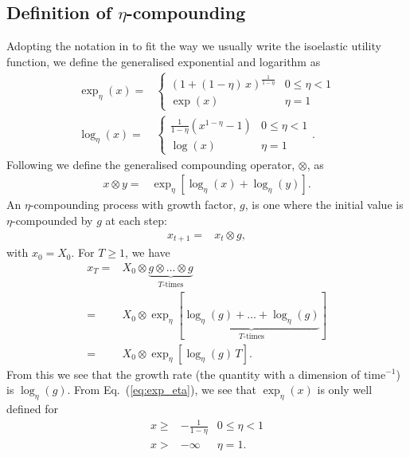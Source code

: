 \documentclass[11pt]{article}
\begin{document}
\begin{multicols}{2}
\section{Definition of $\eta$-compounding}
Adopting the notation in \cite{yamano2002some} to fit the way we usually write the isoelastic utility function, we define the generalised exponential and logarithm as
\begin{align}
\label{eq:exp_eta}
\exp_\eta (x) = & \left\{
\begin{array}{ll} 
\left( 1 + (1-\eta)\,x\right)^\frac{1}{1-\eta} & \text{$0 \leq \eta < 1$}\\
\exp(x) & \text{$\eta=1$}
\end{array}
\right. \\
\label{eq:log_eta}
\log_\eta (x) = & \left\{
\begin{array}{ll} 
\frac{1}{1-\eta}\left( x^{1-\eta} -1 \right) &  \text{$0 \leq \eta < 1$}\\
\log(x) & \text{$\eta=1$}
\end{array}
\right. .
\end{align}
Following \cite{carr2022generalized} we define the generalised compounding operator, $\otimes$, as
\begin{align}
x \otimes y = & \exp_\eta\left[ \log_\eta(x )+ \log_\eta(y)\right].
\end{align}
An $\eta$-compounding process with growth factor, $g$, is one where the initial value is $\eta$-compounded by $g$ at each step:
\begin{align}
x_{t+1} =& x_t \otimes g,
\end{align}
with $x_0 = X_0$. For $T\geq 1$, we have
\begin{align}
\nonumber x_T = & X_0 \otimes  \underbrace{  g\otimes \ldots \otimes g}_{T\text{-times}}\\
\nonumber =&  X_0 \otimes \exp_\eta \left[  \underbrace{  \log_\eta(g)+ \ldots + \log_\eta(g)}_{T\text{-times}}\right]\\
\label{eq:deterministic}=& X_0 \otimes \exp_\eta\left[\log_\eta(g)\,T \right].
\end{align}
From this we see that the growth rate (the quantity with a dimension of $\text{time}^{-1}$) is $\log_\eta(g)$. From Eq.~(\ref{eq:exp_eta}), we see that $\exp_\eta(x)$ is only well defined for
\begin{align*}
x \geq & -\frac{1}{1-\eta} &  \text{$0 \leq \eta < 1$}\\
x >  & -\infty & \text{$\eta=1$}.
\end{align*}

\end{multicols}
\end{document}
